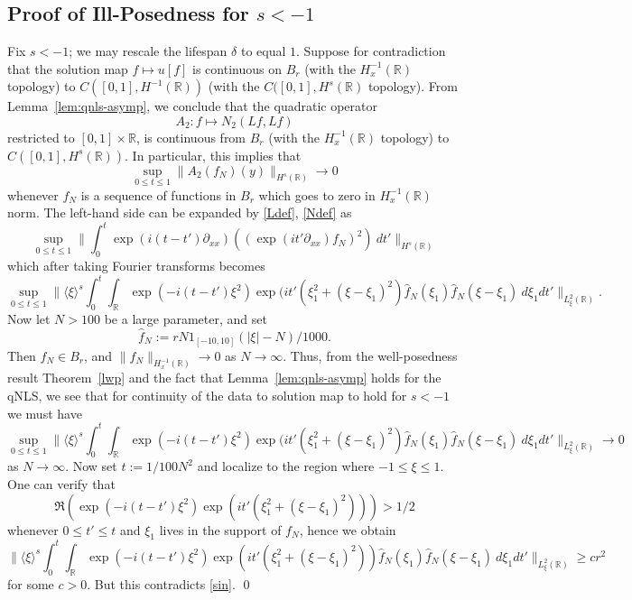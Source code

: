 \documentclass[12pt,reqno]{amsart}
\numberwithin{equation}{section}  %
\newcommand{\rr}{\mathbb{R}}
\newcommand{\R}{\mathbb{R}}
\begin{document}
\subsection{Proof of Ill-Posedness for $s < -1$} 
%
%
%
Fix $s < -1$; we may rescale the lifespan $\delta$ to equal $1$.  Suppose for contradiction
that the solution map $f \mapsto u[f]$ is continuous on $B_r$ (with the
$H^{-1}_x(\R)$ topology) to $C([0, 1], H^{-1}(\rr))$ 
(with the $C([0,1], H^{s}(\rr)$ topology). From 
Lemma~\ref{lem:qnls-asymp}, we conclude that the quadratic operator
$$ A_2: f \mapsto N_2(Lf, Lf)$$ 
restricted to $[0,1] \times \R$, is continuous from $B_r$ (with the $H^{-1}_x(\R)$ topology) 
to $C([0,1], H^{s}(\rr))$.  In particular, this implies that
$$ \sup_{0 \leq t\leq 1}\| A_2(f_N)(y) \|_{H^{s}(\R)} \to 0$$
whenever $f_N$ is a sequence of functions in $B_r$ which goes to zero in $H^{-1}_x(\R)$ norm.
The left-hand side can be expanded by \eqref{Ldef}, \eqref{Ndef} as
$$ \sup_{0 \leq t \leq 1} 
\| \int_0^t \exp(i(t-t')\partial_{xx})((\exp(it' \partial_{xx}) f_N)^2)\ dt' \|_{H^{s}(\R)}$$
which after taking Fourier transforms becomes
$$\sup_{0 \leq t \leq 1} 
\| \langle \xi \rangle^{s}
\int_0^t \int_\R \exp(-i(t-t')\xi^2) \exp(it' (\xi_1^2 + (\xi-\xi_1)^2) \hat f_N(\xi_1) \hat f_N(\xi-\xi_1)\ d\xi_1 dt'
\|_{L^2_\xi(\R)}.$$
Now let $N > 100$ be a large parameter, and set 
$$ \hat f_N := r N 1_{[-10,10]}(|\xi|-N) / 1000.$$
Then $f_N \in B_r$, and $\|f_N\|_{H^{-1}_x(\R)} \to 0$ as $N \to \infty$.  Thus,
from the well-posedness result Theorem~\ref{lwp} and the fact that
Lemma~\ref{lem:qnls-asymp}
holds for
the qNLS, we see that for continuity of the data to solution map to hold for $s < -1$ we must have
\begin{equation}\label{sin}
\sup_{0 \leq t \leq 1} \| \langle \xi \rangle^{s}
\int_0^t \int_\R \exp(-i(t-t')\xi^2) \exp(it' (\xi_1^2 + (\xi-\xi_1)^2) \hat f_N(\xi_1) \hat f_N(\xi-\xi_1)\ d\xi_1 dt'
\|_{L^2_\xi(\R)} \to 0
\end{equation}
as $N \to \infty$.
Now set $t := 1/100N^2$ and localize to the region where $-1 \leq \xi \leq 1$.  One can verify that
$$ \Re( \exp(-i(t-t')\xi^2) \exp(it' (\xi_1^2 + (\xi-\xi_1)^2) )) > 1/2$$
whenever $0 \leq t' \leq t$ and $\xi_1$ lives in the support of $f_{N}$, hence we obtain
$$ 
\| \langle \xi \rangle^{s}
\int_0^t \int_\R \exp(-i(t-t')\xi^2) \exp(it' (\xi_1^2 + (\xi-\xi_1)^2)) \hat f_N(\xi_1) \hat f_N(\xi-\xi_1)\ d\xi_1 dt'
\|_{L^2_\xi(\R)} \geq c r^2$$
for some $c > 0$.  But this contradicts \eqref{sin}. \qed
%
\providecommand{\bysame}{\leavevmode\hbox to3em{\hrulefill}\thinspace}
\end{document}
